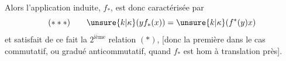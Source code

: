 Alors l'application induite,  $f_*$, est donc caractérisée par
\[
(***)\qquad\unsure{k|\kappa}(yf_*(x))=\unsure{k|\kappa}(f^*(y)x)
\]
et satisfait de ce fait la $2^{\text{ième}}$ relation $(*)$, [donc la première dans le cas commutatif, ou gradué anticommutatif, quand $f_*$ est hom à translation  près].

